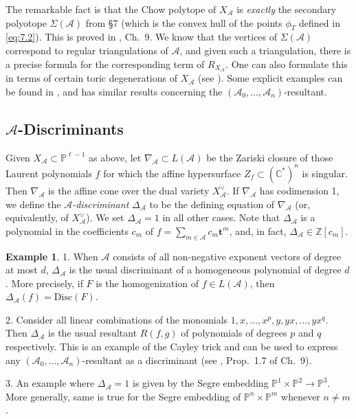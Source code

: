 \documentclass{amsart}
\theoremstyle{plain}
\theoremstyle{definition}
\newtheorem*{example}{Example}
\begin{document}
	The remarkable fact is that the Chow polytope of $X_{\mathcal{A}}$
is {\it exactly\/} the secondary polyotope $\Sigma(\mathcal{A})$ from \S7
(which is the convex hull of the points $\phi_T$ defined in
\eqref{eq:7.2}).  This is proved in \cite{GKZ1}, Ch.~9.  We know
that the vertices of $\Sigma(\mathcal{A})$ correspond to regular
triangulations of $\mathcal{A}$, and given such a triangulation, there is
a precise formula for the corresponding term of $R_{X_{\mathcal{A}}}$.
One can also formulate this in terms of certain toric degenerations of
$X_{\mathcal{A}}$ (see \cite{KSZ1}).  Some explicit examples can be found
in \cite{Stu4}, and \cite{Stu3} has similar results concerning the
$(\mathcal{A}_0,\dots,\mathcal{A}_n)$-resultant.

	\subsection{\texorpdfstring{$\mathcal{A}$}{A}-Discriminants} Given $X_{\mathcal{A}}
\subset \mathbb{P}^{\ell-1}$ as above, let $\nabla_{\mathcal{A}} \subset
L(\mathcal{A})$ be the Zariski closure of those Laurent polynomials $f$
for which the affine hypersurface $Z_f \subset (\mathbb{C}^*)^n$ is
singular.  Then $\nabla_{\mathcal{A}}$ is the affine cone over the dual
variety $X^\vee_{\mathcal{A}}$.  If $\nabla_{\mathcal{A}}$ has codimension 1,
we define the {\it $\mathcal{A}$-discriminant\/} $\Delta_{\mathcal{A}}$ to be
the defining equation of $\nabla_{\mathcal{A}}$ (or, equivalently, of
$X^\vee_{\mathcal{A}}$).  We set $\Delta_{\mathcal{A}} = 1$ in all other
cases.  Note that $\Delta_{\mathcal{A}}$ is a polynomial in the
coefficients $c_m$ of $f = \sum_{m\in\mathcal{A}} c_m \mathbf{t}^m$, and,
in fact, $\Delta_{\mathcal{A}} \in \mathbb{Z}[c_m]$.

\begin{example} 1. When $\mathcal{A}$ consists of all non-negative
exponent vectors of degree at most $d$, $\Delta_{\mathcal{A}}$ is the
usual discriminant of a homogeneous polynomial of degree $d$.  More
precisely, if $F$ is the homogenization of $f \in L(\mathcal{A})$, then
$\Delta_{\mathcal{A}}(f) = \mathrm{Disc}(F)$.

	2. Consider all linear combinations of the monomials
$1,x,\dots,x^p,y,yx,\dots,yx^q$.  Then $\Delta_{\mathcal{A}}$ is the usual
resultant $R(f,g)$ of polynomials of degrees $p$ and $q$ respectively.
This is an example of the Cayley trick and can be used to express any
$(\mathcal{A}_0,\dots,\mathcal{A}_n)$-resultant as a discriminant (see
\cite{GKZ1}, Prop.~1.7 of Ch.~9).

	3. An example where $\Delta_{\mathcal{A}} = 1$ is given by the
Segre embedding $\mathbb{P}^1\times\mathbb{P}^2 \to \mathbb{P}^3$.  More
generally, same is true for the Segre embedding of $\mathbb{P}^n\times\mathbb{P}^m$ whenever $n \ne m$.
\end{example}
\end{document}
